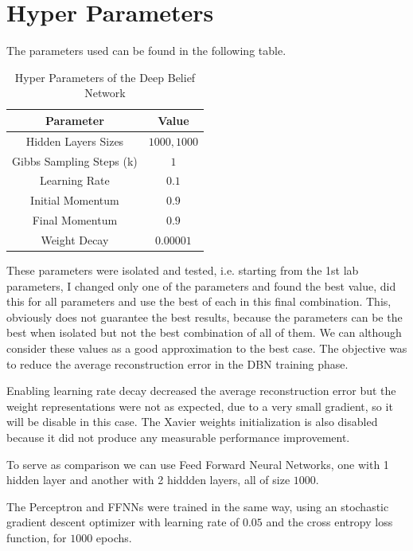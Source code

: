 \documentclass[a4paper, 11pt]{article}
\begin{document}
	\section{Hyper Parameters}
		The parameters used can be found in the following table.
		\begin{table}[H]
			\centering
			\begin{tabular}{|c|c|}
				\hline
				\textbf{Parameter} 		& \textbf{Value} 	\\ \hline
				Hidden Layers Sizes 	& $ 1000,1000 $    	\\ \hline
				Gibbs Sampling Steps (k)&  $ 1 $      		\\ \hline
				Learning Rate			&  $ 0.1 $     		\\ \hline
				Initial Momentum		&  $ 0.9 $    		\\ \hline
				Final Momentum			&  $ 0.9 $    		\\ \hline
				Weight Decay			&  $ 0.00001 $      \\ \hline
			\end{tabular}
			\caption{Hyper Parameters of the Deep Belief Network}
			\label{tab:pars}
		\end{table}
		
		These parameters were isolated and tested, i.e. starting from the 1st lab parameters, I changed only one of the parameters and found the best value, did this for all parameters and use the best of each in this final combination.
		This, obviously does not guarantee the best results, because the parameters can be the best when isolated but not the best combination of all of them.
		We can although consider these values as a good approximation to the best case.
		The objective was to reduce the average reconstruction error in the DBN training phase.
		
		Enabling learning rate decay decreased the average reconstruction error but the weight representations were not as expected, due to a very small gradient, so it will be disable in this case.	
		The Xavier weights initialization is also disabled because it did not produce any measurable performance improvement.
		
		To serve as comparison we can use Feed Forward Neural Networks, one with 1 hidden layer and another with 2 hiddden layers, all of size $ 1000 $.
		
		The Perceptron and FFNNs were trained in the same way, using an stochastic gradient descent optimizer with learning rate of $ 0.05 $ and the cross entropy loss function, for $ 1000 $ epochs. 
				
\end{document}
